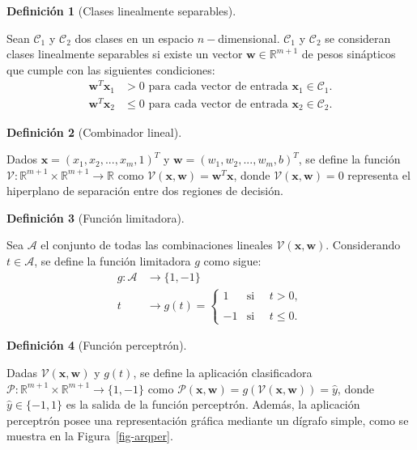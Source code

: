 \documentclass[
  us-letterpaper,
]{scrreprt}
\theoremstyle{plain}
\theoremstyle{definition}
\newtheorem{definition}{Definición}[chapter]
\theoremstyle{definition}
\theoremstyle{plain}
\theoremstyle{remark}
\begin{document}
\begin{definition}[Clases linealmente
separables]\protect\hypertarget{def-cls}{}\label{def-cls}

Sean \(\mathscr C_1\) y \(\mathscr C_2\) dos clases en un espacio
\(n-\)dimensional. \(\mathscr C_1\) y \(\mathscr C_2\) se consideran
clases linealmente separables si existe un vector
\(\mathbf w \in \mathbb R^{m+1}\) de pesos sinápticos que cumple con las
siguientes condiciones: \[
\begin{split}
\mathbf w^T \mathbf x_1 &> 0\text{ para cada vector de entrada } \mathbf x_1 \in \mathscr C_1.\\
\mathbf w^T \mathbf x_2 &\leq 0\text{ para cada vector de entrada } \mathbf x_2 \in \mathscr C_2.
\end{split}
\]

\end{definition}

\begin{definition}[Combinador
lineal]\protect\hypertarget{def-comlin}{}\label{def-comlin}

Dados \(\mathbf x = (x_1, x_2,..., x_m,1)^T\) y
\(\mathbf w = (w_1,w_2,...,w_m,b)^T\), se define la función
\(\mathcal V: \mathbb R^{m+1}\times\mathbb R^{m+1} \rightarrow \mathbb R\)
como \(\mathcal V(\mathbf x, \mathbf w) = \mathbf w^T\mathbf x\), donde
\(\mathcal V(\mathbf x, \mathbf w) = 0\) representa el hiperplano de
separación entre dos regiones de decisión.

\end{definition}

\begin{definition}[Función
limitadora]\protect\hypertarget{def-flim}{}\label{def-flim}

Sea \(\mathscr A\) el conjunto de todas las combinaciones lineales
\(\mathcal V(\mathbf x, \mathbf w)\). Considerando \(t \in \mathscr A\),
se define la función limitadora \(g\) como sigue: \[
\begin{split}
g: \mathscr A &\rightarrow \{1,-1\}\\
t &\rightarrow g(t)= \begin{cases} 1 & \text{si }\quad t> 0,\\ \\-1 & \text{si }\quad t\leq 0.\end{cases}
\end{split}
\]

\end{definition}

\begin{definition}[Función
perceptrón]\protect\hypertarget{def-fper}{}\label{def-fper}

Dadas \(\mathcal V(\mathbf x, \mathbf w)\) y \(g(t)\), se define la
aplicación clasificadora
\(\mathscr P: \mathbb R^{m+1}\times \mathbb R^{m+1} \rightarrow \{1,-1\}\)
como
\(\mathscr P(\mathbf x, \mathbf w)=g(\mathcal V(\mathbf x, \mathbf w))=\hat{y}\),
donde \(\hat{y}\in \{-1,1\}\) es la salida de la función perceptrón.
Además, la aplicación perceptrón posee una representación gráfica
mediante un dígrafo simple, como se muestra en la
Figura~\ref{fig-arqper}.

\end{definition}
\end{document}
